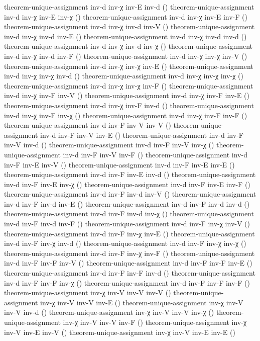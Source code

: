 \documentclass[11pt,a4paper]{article}
\begin{document}
\begin{code}
theorem-unique-assignment inv-d inv-χ inv-E inv-d ()
theorem-unique-assignment inv-d inv-χ inv-E inv-χ ()
theorem-unique-assignment inv-d inv-χ inv-E inv-F ()
theorem-unique-assignment inv-d inv-χ inv-d inv-V ()
theorem-unique-assignment inv-d inv-χ inv-d inv-E ()
theorem-unique-assignment inv-d inv-χ inv-d inv-d ()
theorem-unique-assignment inv-d inv-χ inv-d inv-χ ()
theorem-unique-assignment inv-d inv-χ inv-d inv-F ()
theorem-unique-assignment inv-d inv-χ inv-χ inv-V ()
theorem-unique-assignment inv-d inv-χ inv-χ inv-E ()
theorem-unique-assignment inv-d inv-χ inv-χ inv-d ()
theorem-unique-assignment inv-d inv-χ inv-χ inv-χ ()
theorem-unique-assignment inv-d inv-χ inv-χ inv-F ()
theorem-unique-assignment inv-d inv-χ inv-F inv-V ()
theorem-unique-assignment inv-d inv-χ inv-F inv-E ()
theorem-unique-assignment inv-d inv-χ inv-F inv-d ()
theorem-unique-assignment inv-d inv-χ inv-F inv-χ ()
theorem-unique-assignment inv-d inv-χ inv-F inv-F ()
theorem-unique-assignment inv-d inv-F inv-V inv-V ()
theorem-unique-assignment inv-d inv-F inv-V inv-E ()
theorem-unique-assignment inv-d inv-F inv-V inv-d ()
theorem-unique-assignment inv-d inv-F inv-V inv-χ ()
theorem-unique-assignment inv-d inv-F inv-V inv-F ()
theorem-unique-assignment inv-d inv-F inv-E inv-V ()
theorem-unique-assignment inv-d inv-F inv-E inv-E ()
theorem-unique-assignment inv-d inv-F inv-E inv-d ()
theorem-unique-assignment inv-d inv-F inv-E inv-χ ()
theorem-unique-assignment inv-d inv-F inv-E inv-F ()
theorem-unique-assignment inv-d inv-F inv-d inv-V ()
theorem-unique-assignment inv-d inv-F inv-d inv-E ()
theorem-unique-assignment inv-d inv-F inv-d inv-d ()
theorem-unique-assignment inv-d inv-F inv-d inv-χ ()
theorem-unique-assignment inv-d inv-F inv-d inv-F ()
theorem-unique-assignment inv-d inv-F inv-χ inv-V ()
theorem-unique-assignment inv-d inv-F inv-χ inv-E ()
theorem-unique-assignment inv-d inv-F inv-χ inv-d ()
theorem-unique-assignment inv-d inv-F inv-χ inv-χ ()
theorem-unique-assignment inv-d inv-F inv-χ inv-F ()
theorem-unique-assignment inv-d inv-F inv-F inv-V ()
theorem-unique-assignment inv-d inv-F inv-F inv-E ()
theorem-unique-assignment inv-d inv-F inv-F inv-d ()
theorem-unique-assignment inv-d inv-F inv-F inv-χ ()
theorem-unique-assignment inv-d inv-F inv-F inv-F ()
theorem-unique-assignment inv-χ inv-V inv-V inv-V ()
theorem-unique-assignment inv-χ inv-V inv-V inv-E ()
theorem-unique-assignment inv-χ inv-V inv-V inv-d ()
theorem-unique-assignment inv-χ inv-V inv-V inv-χ ()
theorem-unique-assignment inv-χ inv-V inv-V inv-F ()
theorem-unique-assignment inv-χ inv-V inv-E inv-V ()
theorem-unique-assignment inv-χ inv-V inv-E inv-E ()

\end{code}
\end{document}
